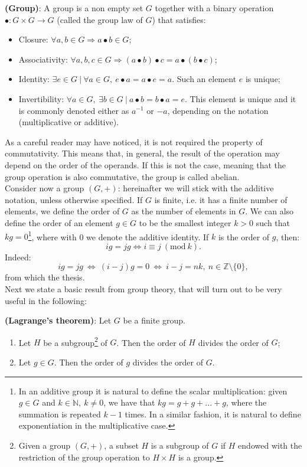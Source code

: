 \begin{mydef} {\bf (Group)}: A group is a non empty set $G$ together with a binary operation $\bullet: G \times G \to G$ (called the 	group law of $G$) that satisfies:
	\begin{itemize}
		\item Closure: $\forall a, b \in G  \Longrightarrow a \bullet b \in G$;
		\item Associativity: $\forall a, b, c \in G  \Longrightarrow (a \bullet b) \bullet c = a \bullet (b \bullet c)$;
		\item Identity: $\exists e \in G \ | \ \forall a \in G, \ e \bullet a = a \bullet e = a$. Such an element $e$ is unique; 
		\item Invertibility: $\forall a \in G, \ \exists b \in G \ | \ a \bullet b = b \bullet a = e$. This element is unique and it is commonly denoted either as $a^{-1}$ or $-a$, depending on the notation (multiplicative or additive).
	\end{itemize}
\end{mydef}
\label{def1}
\noindent
As a careful reader may have noticed, it is not required the property of commutativity. This means that, in general, the result of the operation may depend on the order of the operands. If this is not the case, meaning that the group operation is also commutative, the group is called abelian.
\\
Consider now a group $(G, +)$: hereinafter we will stick with the additive notation, unless otherwise specified.
If $G$ is finite, i.e. it has a finite number of elements, we define the order of $G$ as the number of elements in $G$. We can also define the order of an element $g \in G$ to be the smallest integer $k > 0$ such that $kg = 0$\footnote{In an additive group it is natural to define the scalar multiplication: given $g \in G$ and $k \in \mathbb{N}, \ k \neq 0$, we have that $kg = g + g + ... + g$, where the summation is repeated $k - 1$ times. In a similar fashion, it is natural to define exponentiation in the multiplicative case.}, where with 0 we denote the additive identity. If $k$ is the order of $g$, then:
$$ig = jg \Longleftrightarrow i \equiv j \ (\text{mod} \ k).$$
Indeed:
$$ig = jg \ \Longleftrightarrow \ (i - j)g = 0 \ \Longleftrightarrow \ i - j = nk, \ n \in \mathbb{Z}\text{\textbackslash}\{0\},$$
from which the thesis.
\\
Next we state a basic result from group theory, that will turn out to be very useful in the following:
\begin{thm} {\bf (Lagrange's theorem)}:
	Let $G$ be a finite group.
	\begin{enumerate}
		\item Let $H$ be a subgroup\footnote{Given a group $(G, +)$, a subset $H$ is a subgroup of $G$ if $H$ endowed with the restriction of the group operation to $H \times H$ is a group.} of $G$. Then the order of $H$ divides the order of $G$;
		\item Let $g \in G$. Then the order of $g$ divides the order of $G$.
	\end{enumerate}
\end{thm}

